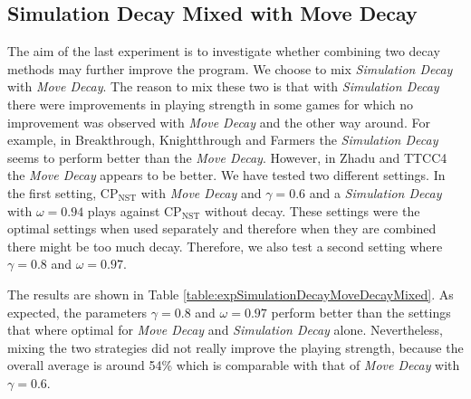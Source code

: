 \documentclass[journal]{IEEEtran}
\begin{document}
\subsection{Simulation Decay Mixed with Move Decay}
The aim of the last experiment is to investigate whether combining two decay methods may further improve the program. We choose to mix \textit{Simulation Decay} with \textit{Move Decay}. The reason to mix these two is that with \textit{Simulation Decay} there were improvements in playing strength in some games for which no improvement was observed with \textit{Move Decay} and the other way around. For example, in Breakthrough, Knightthrough and Farmers the \textit{Simulation Decay} seems to perform better than the \textit{Move Decay}. However, in Zhadu and TTCC4 the \textit{Move Decay} appears to be better.
We have tested two different settings. In the first setting, CP$_{\textrm{NST}}$ with \textit{Move Decay} and $\gamma=0.6$ and a \textit{Simulation Decay} with $\omega=0.94$ plays against CP$_{\textrm{NST}}$ without decay. These settings were the optimal settings when used separately and therefore when they are combined there might be too much decay. Therefore, we also test a second setting where $\gamma=0.8$ and $\omega=0.97$.

The results are shown in Table \ref{table:expSimulationDecayMoveDecayMixed}. As expected, the parameters $\gamma=0.8$ and $\omega=0.97$ perform better than the settings that where optimal for \textit{Move Decay} and \textit{Simulation Decay} alone. Nevertheless, mixing the two strategies did not really improve the playing strength, because the overall average is around 54\% which is comparable with that of \textit{Move Decay} with $\gamma=0.6$. 
\end{document}
